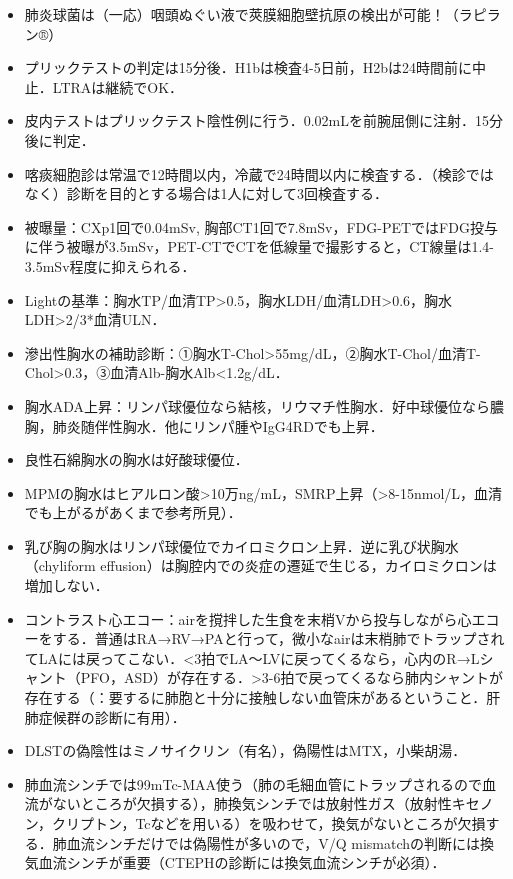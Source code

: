 \begin{itemize}
\item 肺炎球菌は（一応）咽頭ぬぐい液で莢膜細胞壁抗原の検出が可能！（ラピラン®）
\item プリックテストの判定は15分後．H1bは検査4-5日前，H2bは24時間前に中止．LTRAは継続でOK．
\item 皮内テストはプリックテスト陰性例に行う．0.02mLを前腕屈側に注射．15分後に判定．
\item 喀痰細胞診は常温で12時間以内，冷蔵で24時間以内に検査する．（検診ではなく）診断を目的とする場合は1人に対して3回検査する．
\item 被曝量：CXp1回で0.04mSv, 胸部CT1回で7.8mSv，FDG-PETではFDG投与に伴う被曝が3.5mSv，PET-CTでCTを低線量で撮影すると，CT線量は1.4-3.5mSv程度に抑えられる．
\item Lightの基準：胸水TP/血清TP>0.5，胸水LDH/血清LDH>0.6，胸水LDH>2/3*血清ULN．
\item 滲出性胸水の補助診断：①胸水T-Chol>55mg/dL，②胸水T-Chol/血清T-Chol>0.3，③血清Alb-胸水Alb<1.2g/dL．
\item 胸水ADA上昇：リンパ球優位なら結核，リウマチ性胸水．好中球優位なら膿胸，肺炎随伴性胸水．他にリンパ腫やIgG4RDでも上昇．
\item 良性石綿胸水の胸水は好酸球優位．
\item MPMの胸水はヒアルロン酸>10万ng/mL，SMRP上昇（>8-15nmol/L，血清でも上がるがあくまで参考所見）．
\item 乳び胸の胸水はリンパ球優位でカイロミクロン上昇．逆に乳び状胸水（chyliform effusion）は胸腔内での炎症の遷延で生じる，カイロミクロンは増加しない．
\item コントラスト心エコー：airを撹拌した生食を末梢Vから投与しながら心エコーをする．普通はRA→RV→PAと行って，微小なairは末梢肺でトラップされてLAには戻ってこない．<3拍でLA〜LVに戻ってくるなら，心内のR→Lシャント（PFO，ASD）が存在する．>3-6拍で戻ってくるなら肺内シャントが存在する（：要するに肺胞と十分に接触しない血管床があるということ．肝肺症候群の診断に有用）．
\item DLSTの偽陰性はミノサイクリン（有名），偽陽性はMTX，小柴胡湯．
\item 肺血流シンチでは99mTc-MAA使う（肺の毛細血管にトラップされるので血流がないところが欠損する），肺換気シンチでは放射性ガス（放射性キセノン，クリプトン，Tcなどを用いる）を吸わせて，換気がないところが欠損する．肺血流シンチだけでは偽陽性が多いので，V/Q mismatchの判断には換気血流シンチが重要（CTEPHの診断には換気血流シンチが必須）．
\end{itemize}


